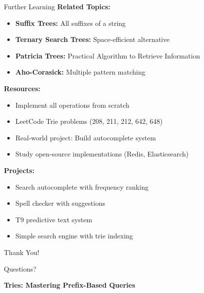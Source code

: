 \documentclass[aspectratio=169]{beamer}
\begin{document}
\begin{frame}{Further Learning}
  \textbf{Related Topics:}
  \begin{itemize}
    \item \textbf{Suffix Trees:} All suffixes of a string
    \item \textbf{Ternary Search Trees:} Space-efficient alternative
    \item \textbf{Patricia Trees:} Practical Algorithm to Retrieve Information
    \item \textbf{Aho-Corasick:} Multiple pattern matching
  \end{itemize}

  \vspace{0.3cm}
  \textbf{Resources:}
  \begin{itemize}
    \item Implement all operations from scratch
    \item LeetCode Trie problems (208, 211, 212, 642, 648)
    \item Real-world project: Build autocomplete system
    \item Study open-source implementations (Redis, Elasticsearch)
  \end{itemize}

  \vspace{0.3cm}
  \textbf{Projects:}
  \begin{itemize}
    \item Search autocomplete with frequency ranking
    \item Spell checker with suggestions
    \item T9 predictive text system
    \item Simple search engine with trie indexing
  \end{itemize}
\end{frame}

\begin{frame}
  \begin{center}
    {\Huge Thank You!}

    \vspace{1cm}
    {\Large Questions?}

    \vspace{1cm}
    \textbf{Tries: Mastering Prefix-Based Queries}
  \end{center}
\end{frame}
\end{document}
